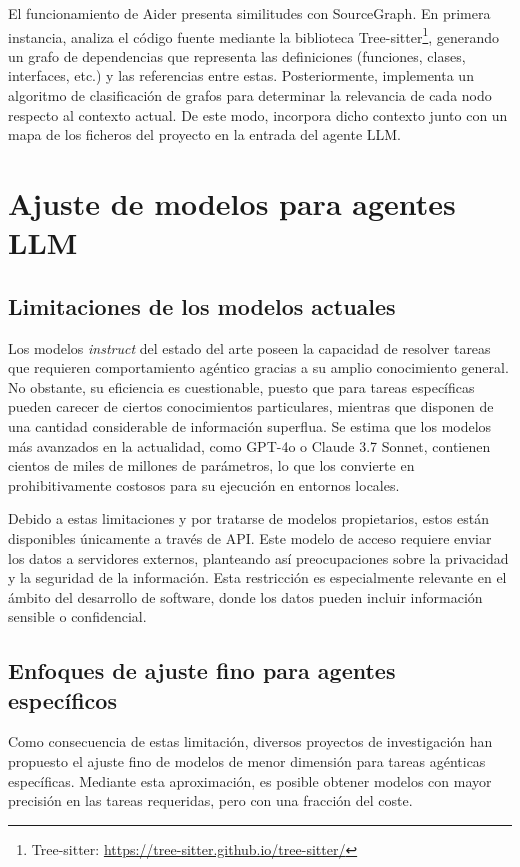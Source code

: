 \begin{itemize}
  El funcionamiento de Aider presenta similitudes con SourceGraph\cite{noauthor_building_2023}. En primera instancia, analiza el código fuente mediante la biblioteca Tree-sitter\footnote{Tree-sitter: \url{https://tree-sitter.github.io/tree-sitter/}}, generando un grafo de dependencias que representa las definiciones (funciones, clases, interfaces, etc.) y las referencias entre estas. Posteriormente, implementa un algoritmo de clasificación de grafos para determinar la relevancia de cada nodo respecto al contexto actual. De este modo, incorpora dicho contexto junto con un mapa de los ficheros del proyecto en la entrada del agente LLM.  

\end{itemize}

\section{Ajuste de modelos para agentes LLM}
\subsection{Limitaciones de los modelos actuales}
Los modelos \textit{instruct} del estado del arte poseen la capacidad de resolver tareas que requieren comportamiento agéntico gracias a su amplio conocimiento general. No obstante, su eficiencia es cuestionable, puesto que para tareas específicas pueden carecer de ciertos conocimientos particulares, mientras que disponen de una cantidad considerable de información superflua. Se estima que los modelos más avanzados en la actualidad, como GPT-4o o Claude 3.7 Sonnet, contienen cientos de miles de millones de parámetros\cite{noauthor_number_2024}, lo que los convierte en prohibitivamente costosos para su ejecución en entornos locales.

Debido a estas limitaciones y por tratarse de modelos propietarios, estos están disponibles únicamente a través de API. Este modelo de acceso requiere enviar los datos a servidores externos, planteando así preocupaciones sobre la privacidad y la seguridad de la información. Esta restricción es especialmente relevante en el ámbito del desarrollo de software, donde los datos pueden incluir información sensible o confidencial.

\subsection{Enfoques de ajuste fino para agentes específicos}
Como consecuencia de estas limitación, diversos proyectos de investigación han propuesto el ajuste fino de modelos de menor dimensión para tareas agénticas específicas. Mediante esta aproximación, es posible obtener modelos con mayor precisión en las tareas requeridas, pero con una fracción del coste.

